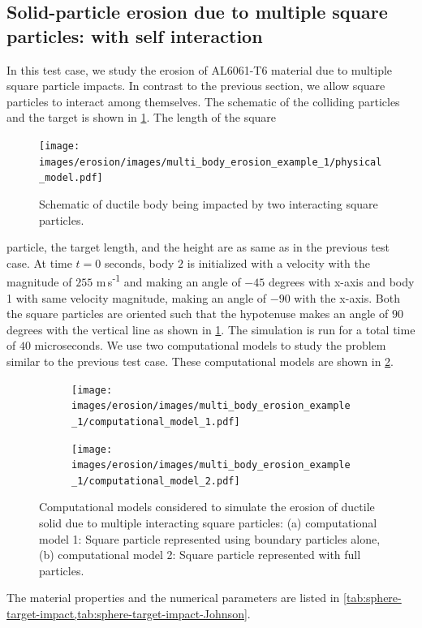 \FloatBarrier%
\subsection{Solid-particle erosion due to multiple square particles: with
  self interaction}
\label{sec:erosion-multiple-impact-self-interact}
In this test case, we study the erosion of AL6061-T6 material due to multiple
square particle impacts. In contrast to the previous section, we allow square
particles to interact among themselves. The schematic of the colliding particles
and the target is shown in \cref{fig:mpe-1-pm}. The length of the square
\begin{figure}[!htpb]
  \centering
  \texttt{[image: images/erosion/images/multi\_body\_erosion\_example\_1/physical\_model.pdf]}
  \caption{Schematic of ductile body being impacted by two interacting square
    particles.}
\label{fig:mpe-1-pm}
\end{figure}
particle, the target length, and the height are as same as in the previous test
case. At time $t=0$ seconds, body $2$ is initialized with a velocity with the
magnitude of $255$ m\,s\textsuperscript{-1} and making an angle of $-45$ degrees
with x-axis and body 1 with same velocity magnitude, making an angle of $-90$
with the x-axis. Both the square particles are oriented such that the hypotenuse
makes an angle of $90$ degrees with the vertical line as shown in
\cref{fig:mpe-1-pm}. The simulation is run for a total time of $40$
microseconds. We use two computational models to study the problem similar to
the previous test case. These computational models are shown in
\cref{fig:mpe-1-cm}.
\begin{figure}[!htpb]
  \centering
  \begin{subfigure}{0.48\textwidth}
    \centering
    \texttt{[image: images/erosion/images/multi\_body\_erosion\_example\_1/computational\_model\_1.pdf]}
    \subcaption{}
  \end{subfigure}
  \begin{subfigure}{0.48\textwidth}
    \centering
    \texttt{[image: images/erosion/images/multi\_body\_erosion\_example\_1/computational\_model\_2.pdf]}
    \subcaption{}
  \end{subfigure}
  \caption{Computational models considered to simulate the erosion of ductile
    solid due to multiple interacting square particles: (a) computational model
    1: Square particle represented using boundary particles alone, (b)
    computational model 2: Square particle represented with full particles.}
\label{fig:mpe-1-cm}
\end{figure}
The material properties and the numerical parameters are listed in
\cref{tab:sphere-target-impact,tab:sphere-target-impact-Johnson}.


